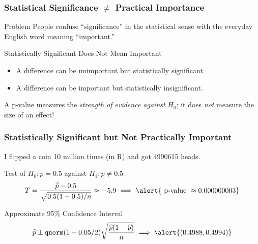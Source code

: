 \begin{frame}
  \frametitle{Statistical Significance $\neq$ Practical Importance}

\begin{block}{Problem}
  People confuse ``significance'' in the statistical sense with the everyday English word meaning ``important.''
\end{block}

\pause

\begin{block}{Statistically Significant Does Not Mean Important}
  \vspace{-0.5em}
			\begin{itemize}
				\item A difference can be unimportant but statistically significant.
				\item A difference can be important but statistically insignificant.
			\end{itemize}
\end{block}

\pause

\alert{A p-value measures the \emph{strength of evidence against} $H_0$; it does \emph{not} measure the size of an effect!}

\end{frame}


\begin{frame}
\frametitle{Statistically Significant but Not Practically Important}
\small
I flipped a coin 10 million times (in R) and got 4990615 heads.
\begin{block}{Test of $H_0\colon p = 0.5$ against $H_1\colon p \neq 0.5$}
$$T = \displaystyle \frac{\widehat{p} - 0.5}{\sqrt{0.5(1-0.5)/n}} \approx -5.9   \implies \alert{\mbox{ p-value } \approx 0.000000003}$$
\end{block}

\begin{block}{Approximate 95\% Confidence Interval}
 $$\widehat{p} \pm \texttt{qnorm}(1 - 0.05/2) \sqrt{\frac{\widehat{p}(1-\widehat{p})}{n}}  \implies \alert{(0.4988, 0.4994)}$$
\end{block}

\large
\vspace{1em}

\alert{}
\end{frame}

